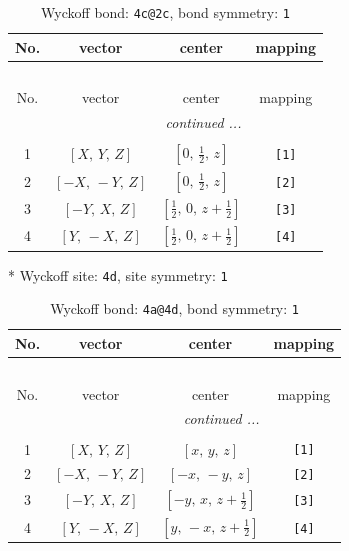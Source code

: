 \documentclass[fleqn,8pt]{jsarticle}
\begin{document}
\begin{longtable}{cccc}
\caption{Wyckoff bond: {\tt 4c@2c}, bond symmetry: {\tt 1}}
 \\
 \hline \hline
No. & vector & center & mapping \\ \hline \endfirsthead

\multicolumn{3}{l}{\tablename\ \thetable{}} \\
 \hline \hline
No. & vector & center & mapping \\ \hline \endhead

 \hline \hline
\multicolumn{3}{r}{\footnotesize\it continued ...} \\ \endfoot

 \hline \hline
\multicolumn{3}{r}{} \\ \endlastfoot

1 & $\left[ X,\, Y,\, Z \right]$ & $\left[ 0,\, \frac{1}{2},\, z \right]$ & {\tt [1]} \\ \hline
2 & $\left[ - X,\, - Y,\, Z \right]$ & $\left[ 0,\, \frac{1}{2},\, z \right]$ & {\tt [2]} \\ \hline
3 & $\left[ - Y,\, X,\, Z \right]$ & $\left[ \frac{1}{2},\, 0,\, z + \frac{1}{2} \right]$ & {\tt [3]} \\ \hline
4 & $\left[ Y,\, - X,\, Z \right]$ & $\left[ \frac{1}{2},\, 0,\, z + \frac{1}{2} \right]$ & {\tt [4]} \\
\end{longtable}
* Wyckoff site: {\tt 4d}, site symmetry: {\tt 1}
\renewcommand{\arraystretch}{1.2}
\begin{longtable}{cccc}
\caption{Wyckoff bond: {\tt 4a@4d}, bond symmetry: {\tt 1}}
 \\
 \hline \hline
No. & vector & center & mapping \\ \hline \endfirsthead

\multicolumn{3}{l}{\tablename\ \thetable{}} \\
 \hline \hline
No. & vector & center & mapping \\ \hline \endhead

 \hline \hline
\multicolumn{3}{r}{\footnotesize\it continued ...} \\ \endfoot

 \hline \hline
\multicolumn{3}{r}{} \\ \endlastfoot

1 & $\left[ X,\, Y,\, Z \right]$ & $\left[ x,\, y,\, z \right]$ & {\tt [1]} \\ \hline
2 & $\left[ - X,\, - Y,\, Z \right]$ & $\left[ - x,\, - y,\, z \right]$ & {\tt [2]} \\ \hline
3 & $\left[ - Y,\, X,\, Z \right]$ & $\left[ - y,\, x,\, z + \frac{1}{2} \right]$ & {\tt [3]} \\ \hline
4 & $\left[ Y,\, - X,\, Z \right]$ & $\left[ y,\, - x,\, z + \frac{1}{2} \right]$ & {\tt [4]} \\
\end{longtable}
\end{document}
